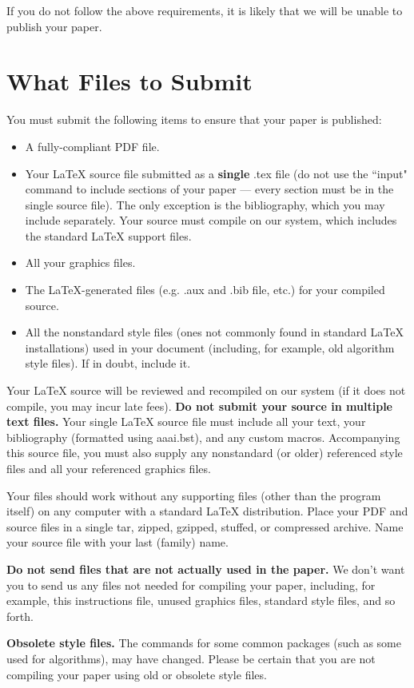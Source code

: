 \documentclass[letterpaper]{article}
\begin{document}
If you do not follow the above requirements, it is likely that we will be unable to publish your paper.

\section{What Files to Submit}
You must submit the following items to ensure that your paper is published:
\begin{itemize}
\item A fully-compliant PDF file.
\item Your  \LaTeX{}  source file submitted as a \textbf{single} .tex file (do not use the ``input" command to include sections of your paper --- every section must be in the single source file). The only exception is the bibliography, which you may include separately. Your source must compile on our system, which includes the standard \LaTeX{} support files.
\item All your graphics files.
\item The \LaTeX{}-generated files (e.g. .aux and .bib file, etc.) for your compiled source.
\item All the nonstandard style files (ones not commonly found in standard \LaTeX{} installations) used in your document (including, for example, old algorithm style files). If in doubt, include it.
\end{itemize}

Your \LaTeX{} source will be reviewed and recompiled on our system (if it does not compile, you may incur late fees).   \textbf{Do not submit your source in multiple text files.} Your single \LaTeX{} source file must include all your text, your bibliography (formatted using aaai.bst), and any custom macros. Accompanying this source file, you must also supply any nonstandard (or older) referenced style files and all your referenced graphics files. 

Your files should work without any supporting files (other than the program itself) on any computer with a standard \LaTeX{} distribution. Place your PDF and source files in a single tar, zipped, gzipped, stuffed, or compressed archive. Name your source file with your last (family) name.

\textbf{Do not send files that are not actually used in the paper.} We don't want you to send us any files not needed for compiling your paper, including, for example, this instructions file, unused graphics files, standard style files, and so forth.

\textbf{Obsolete style files.}  The commands for some common packages (such as some used for algorithms), may have changed. Please be certain that you are not compiling your paper using old or obsolete style files. 
\end{document}
